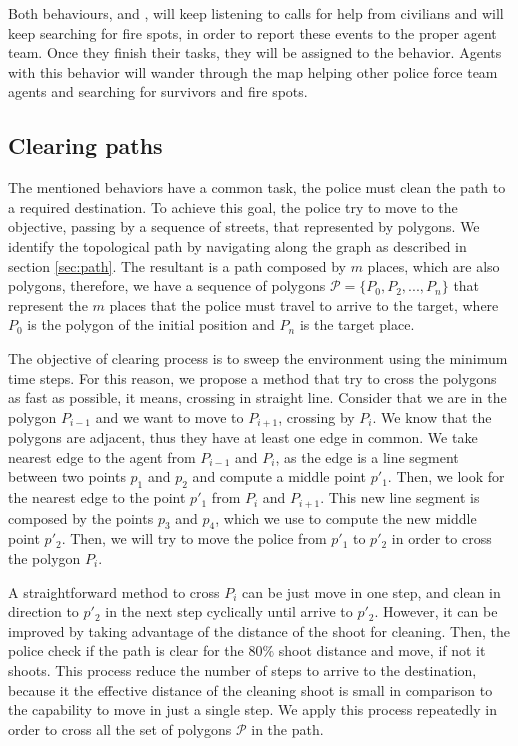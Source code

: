 Both behaviours,  and , will keep listening to calls for help from civilians and will keep searching for fire spots, in order to report these events to the proper agent team. Once they finish their tasks, they will be assigned to the  behavior. Agents with this behavior will wander through the map helping other police force team agents and searching for survivors and fire spots.

\subsection{Clearing paths}
The mentioned behaviors have a common task, the police must clean the path to a required destination.
To achieve this goal, the police try to move to the objective, passing by a sequence of streets, that represented by polygons. We identify the topological path by navigating along the graph as described in section \ref{sec:path}. The resultant is a path composed by $m$ places, which are also polygons, therefore, we have a sequence of polygons $\mathcal{P} = \{P_0, P_2, ..., P_n \}$ that represent the $m$ places that the police must travel to arrive to the target, where $P_0$ is the polygon of the initial position and $P_n$ is the target place.

The objective of clearing process is to sweep the environment using the minimum time steps.
For this reason, we propose a method that try to cross the polygons as fast as possible, it means, crossing in straight line.
Consider that we are in the polygon $P_{i-1}$ and we want to move to  $P_{i+1}$, crossing by  $P_{i}$.
We know that the polygons are adjacent, thus they have at least one edge in common.
We take nearest edge to the agent from $P_{i-1}$ and $P_{i}$, as the edge is a line segment between two points $p_1$ and $p_2$ and compute a middle point $p'_1$.
Then, we look for the nearest edge to the point $p'_1$ from $P_{i}$ and $P_{i+1}$. This new line segment is composed by the points $p_3$ and $p_4$, which we use to compute the new middle point $p'_2$. Then, we will try to move the police from  $p'_1$ to $p'_2$ in order to cross the polygon $P_{i}$.

A straightforward method to cross $P_{i}$ can be just move in one step, and clean in direction to $p'_2$ in the next step cyclically until arrive to $p'_2$. However,
it can be improved by taking advantage of the distance of the shoot for cleaning.
Then, the police check if the path is clear for the $80\%$ shoot distance and move, if not it shoots. This process reduce the number of steps to arrive to the destination, because it the effective distance of the cleaning shoot is small in comparison to the capability to move in just a single step.
We apply this process repeatedly in order to cross all the set of polygons $\mathcal{P}$ in the path.


